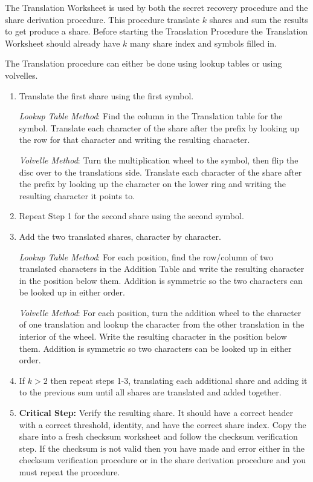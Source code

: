 \documentclass{article}
\newcommand{\tmem}[1]{{\em #1\/}}
\newcommand{\tmstrong}[1]{\textbf{#1}}
\newcommand{\tmverbatim}[1]{{\ttfamily{#1}}}
\newenvironment{enumeratenumeric}{\begin{enumerate}[1.] }{\end{enumerate}}
\begin{document}
The Translation Worksheet is used by both the secret recovery procedure and
the share derivation procedure. This procedure translate $k$ shares and sum
the results to get produce a share. Before starting the Translation Procedure
the Translation Worksheet should already have $k$ many share index and symbols
filled in.

The Translation procedure can either be done using lookup tables or using
volvelles.
\begin{enumeratenumeric}
  \item Translate the first share using the first symbol.
  
  {\tmem{Lookup Table Method}}: Find the column in the Translation table for
  the symbol. Translate each character of the share after the \tmverbatim{MS1}
  prefix by looking up the row for that character and writing the resulting
  character.
  
  {\tmem{Volvelle Method}}: Turn the multiplication wheel to the symbol, then
  flip the disc over to the translations side. Translate each character of the
  share after the \tmverbatim{MS1} prefix by looking up the character on the
  lower ring and writing the resulting character it points to.
  
  \item Repeat Step 1 for the second share using the second symbol.
  
  \item Add the two translated shares, character by character.
  
  {\tmem{Lookup Table Method}}: For each position, find the row/column of two
  translated characters in the Addition Table and write the resulting
  character in the position below them. Addition is symmetric so the two
  characters can be looked up in either order.
  
  {\tmem{Volvelle Method}}: For each position, turn the addition wheel to the
  character of one translation and lookup the character from the other
  translation in the interior of the wheel. Write the resulting character in
  the position below them. Addition is symmetric so two characters can be
  looked up in either order.
  
  \item If $k > 2$ then repeat steps 1-3, translating each additional share
  and adding it to the previous sum until all shares are translated and added
  together.
  
  \item {\tmstrong{Critical Step:}} Verify the resulting share. It should have
  a correct header with a correct threshold, identity, and have the correct
  share index. Copy the share into a fresh checksum worksheet and follow the
  checksum verification step. If the checksum is not valid then you have made
  and error either in the checksum verification procedure or in the share
  derivation procedure and you must repeat the procedure.
\end{enumeratenumeric}
\end{document}
